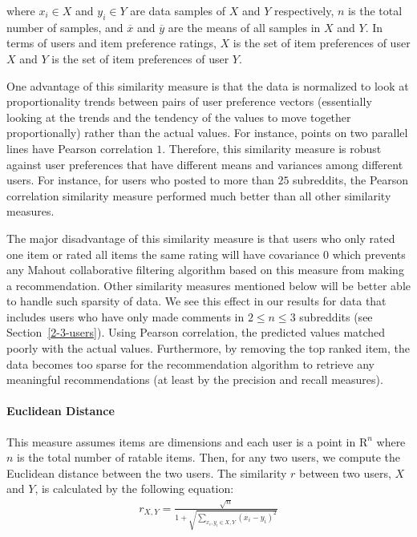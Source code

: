 \documentclass{article}
\begin{document}
where $x_i \in X$ and $y_i \in Y$ are data samples of $X$ and $Y$ respectively, $n$ is the total number of samples,
and $\overline{x}$ and $\overline{y}$ are the means of all samples in $X$ and $Y$. In terms of users and 
item preference ratings, $X$ is the set of item preferences of user $X$ and $Y$ is the set of item 
preferences of user $Y$. 

One advantage of this similarity measure is that the data is normalized to look at proportionality trends between 
pairs of user preference vectors (essentially looking at the trends and the tendency of the values to move 
together proportionally) rather than the actual values. For instance, points on two parallel lines have Pearson 
correlation $1$. Therefore, this similarity measure is robust against user preferences that have different means and variances among different users. For instance, for users who
posted to more than $25$ subreddits, the Pearson correlation similarity measure performed much
better than all other similarity measures.

The major disadvantage of this similarity measure is that users who only rated one item or rated all items the 
same rating will have covariance $0$ which prevents any Mahout collaborative filtering algorithm based 
on this measure from making a recommendation. Other similarity measures mentioned below will be better able
to handle such sparsity of data. We see this effect in our results for data that includes users who have
only made comments in $2 \leq n \leq 3$ subreddits (see Section~\ref{2-3-users}). 
Using Pearson correlation, the predicted values matched poorly
with the actual values. Furthermore, by removing the top ranked item, the data becomes too sparse for the recommendation algorithm to retrieve any meaningful recommendations (at least by the precision and recall measures).

\paragraph{Euclidean Distance}

This measure assumes items are dimensions and each user is a point in $\mathrm{R}^n$ where $n$ is the total
number of ratable items. Then, for any two users, we compute the Euclidean distance between the two users.
The similarity $r$ between two users, $X$ and $Y$, is calculated by the following equation: \begin{align*}
r_{X, Y} = \frac{\sqrt{n}}{1 + \sqrt{\sum_{x_i, y_i \in X, Y} (x_i - y_i)^2}}
\end{align*}
\end{document}

